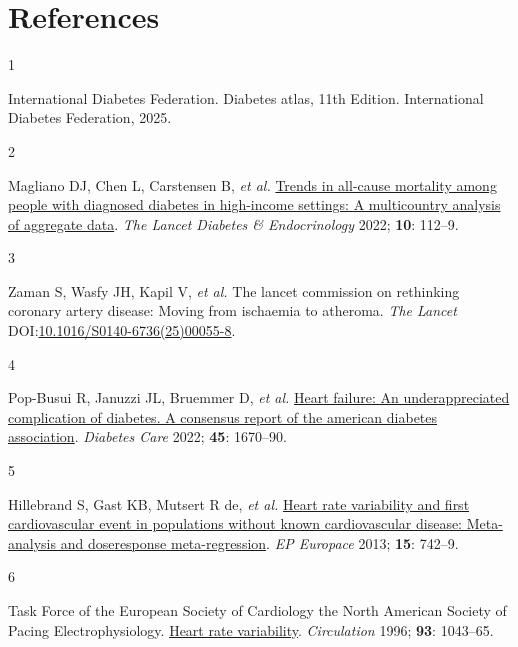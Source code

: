 \documentclass[
  a4paper,
  headsepline=true,
  open=any]{scrbook}
\newlength{\cslhangindent}
\newlength{\csllabelwidth}
\newlength{\cslentryspacingunit} %
\newenvironment{CSLReferences}[2] %
 {%
  \setlength{\parindent}{0pt}
  \ifodd #1
  \let\oldpar\par
  \def\par{\hangindent=\cslhangindent\oldpar}
  \fi
  \setlength{\parskip}{#2\cslentryspacingunit}
 }%
 {}
\newcommand{\CSLLeftMargin}[1]{\parbox[t]{\csllabelwidth}{#1}}
\newcommand{\CSLRightInline}[1]{\parbox[t]{\linewidth - \csllabelwidth}{#1}\break}
\begin{document}

\hypertarget{references}{%
\chapter*{References}\label{references}}


\hypertarget{refs}{}
\begin{CSLReferences}{0}{0}
\leavevmode{}%
\CSLLeftMargin{1 }%
\CSLRightInline{International Diabetes Federation. Diabetes atlas, 11th
Edition. International Diabetes Federation, 2025.}

\leavevmode{}%
\CSLLeftMargin{2 }%
\CSLRightInline{Magliano DJ, Chen L, Carstensen B, \emph{et al.}
\href{https://doi.org/10.1016/S2213-8587(21)00327-2}{Trends in all-cause
mortality among people with diagnosed diabetes in high-income settings:
A multicountry analysis of aggregate data}. \emph{The Lancet Diabetes \&
Endocrinology} 2022; \textbf{10}: 112--9.}

\leavevmode{}%
\CSLLeftMargin{3 }%
\CSLRightInline{Zaman S, Wasfy JH, Kapil V, \emph{et al.} The lancet
commission on rethinking coronary artery disease: Moving from ischaemia
to atheroma. \emph{The Lancet}
DOI:\href{https://doi.org/10.1016/S0140-6736(25)00055-8}{10.1016/S0140-6736(25)00055-8}.}

\leavevmode{}%
\CSLLeftMargin{4 }%
\CSLRightInline{Pop-Busui R, Januzzi JL, Bruemmer D, \emph{et al.}
\href{https://doi.org/10.2337/dci22-0014}{Heart failure: An
underappreciated complication of diabetes. A consensus report of the
american diabetes association}. \emph{Diabetes Care} 2022; \textbf{45}:
1670--90.}

\leavevmode{}%
\CSLLeftMargin{5 }%
\CSLRightInline{Hillebrand S, Gast KB, Mutsert R de, \emph{et al.}
\href{https://doi.org/10.1093/europace/eus341}{Heart rate variability
and first cardiovascular event in populations without known
cardiovascular disease: Meta-analysis and dose{\textendash}response
meta-regression}. \emph{EP Europace} 2013; \textbf{15}: 742--9.}

\leavevmode{}%
\CSLLeftMargin{6 }%
\CSLRightInline{Task Force of the European Society of Cardiology the
North American Society of Pacing Electrophysiology.
\href{https://doi.org/doi:10.1161/01.CIR.93.5.1043}{Heart rate
variability}. \emph{Circulation} 1996; \textbf{93}: 1043--65.}


\end{CSLReferences}
\end{document}
